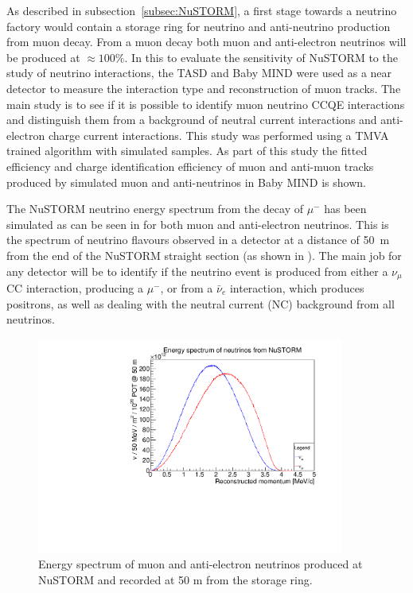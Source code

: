 As described in subsection~\ref{subsec:NuSTORM}, a first stage towards a neutrino factory would contain a storage ring for neutrino and anti-neutrino production from muon decay. From a muon decay both muon and anti-electron neutrinos will be produced at $\approx 100\%$. In this to evaluate the sensitivity of NuSTORM to the study of neutrino interactions, the TASD and Baby MIND were used as a near detector to measure the interaction type and reconstruction of muon tracks. The main study is to see if it is possible to identify muon neutrino CCQE interactions and distinguish them from a background of neutral current interactions and anti-electron charge current interactions. This study was performed using a TMVA trained algorithm with simulated samples. As part of this study the fitted efficiency and charge identification efficiency of muon and anti-muon tracks produced by simulated muon and anti-neutrinos in Baby MIND is shown.

The NuSTORM neutrino energy spectrum from the decay of $\mu^-$ has been simulated as can be seen in  for both muon and anti-electron neutrinos. This is the spectrum of neutrino flavours observed in a detector at a distance of 50~m from the end of the NuSTORM straight section (as shown in ). The main job for any detector will be to identify if the neutrino event is produced from either a $\nu_\mu$ CC interaction, producing a $\mu^-$, or from a $\bar{\nu}_e$ interaction, which produces positrons, as well as dealing with the neutral current (NC) background from all neutrinos.

\begin{figure}[h!]
\centering
\includegraphics[width=0.9\textwidth]{figures/eSpectrum.pdf}
\caption{Energy spectrum of muon and anti-electron neutrinos produced at NuSTORM and recorded at 50 m from the storage ring.}
\label{fig:NuSTORMeSpectrum}
\end{figure}

